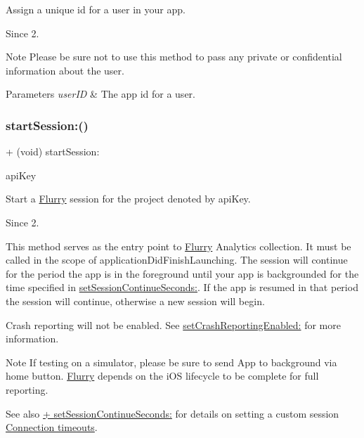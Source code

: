 Assign a unique id for a user in your app. 

\begin{DoxySince}{Since}
2.
\end{DoxySince}
\begin{DoxyNote}{Note}
Please be sure not to use this method to pass any private or confidential information about the user.
\end{DoxyNote}

\begin{DoxyParams}{Parameters}
{\em user\+ID} & The app id for a user. \\
\hline
\end{DoxyParams}
\mbox{\label{interfaceFlurry_aeadfa23545c392ffd46db448b6a95809}} 
\subsubsection{\texorpdfstring{start\+Session\+:()}{startSession:()}}
{\footnotesize\ttfamily + (void) start\+Session\+: \begin{DoxyParamCaption}\item[{(N\+S\+String $\ast$)}]{api\+Key }\end{DoxyParamCaption}}



Start a \hyperlink{interfaceFlurry}{Flurry} session for the project denoted by {\ttfamily api\+Key}. 

\begin{DoxySince}{Since}
2.
\end{DoxySince}
This method serves as the entry point to \hyperlink{interfaceFlurry}{Flurry} Analytics collection. It must be called in the scope of {\ttfamily application\+Did\+Finish\+Launching}. The session will continue for the period the app is in the foreground until your app is backgrounded for the time specified in \hyperlink{interfaceFlurry_a1b79d4d804074f4b66f3434d9318ceee}{set\+Session\+Continue\+Seconds\+:}. If the app is resumed in that period the session will continue, otherwise a new session will begin.

Crash reporting will not be enabled. See \hyperlink{interfaceFlurry_a20dbc3ff9cc3c114aad7e7713547dfe1}{set\+Crash\+Reporting\+Enabled\+:} for more information.

\begin{DoxyNote}{Note}
If testing on a simulator, please be sure to send App to background via home button. \hyperlink{interfaceFlurry}{Flurry} depends on the i\+OS lifecycle to be complete for full reporting.
\end{DoxyNote}
\begin{DoxySeeAlso}{See also}
\hyperlink{interfaceFlurry_a1b79d4d804074f4b66f3434d9318ceee}{+ set\+Session\+Continue\+Seconds\+:} for details on setting a custom session \hyperlink{group__timeout}{Connection timeouts}.
\end{DoxySeeAlso}

